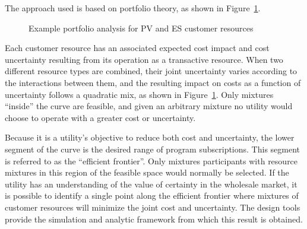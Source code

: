 The approach used is based on portfolio theory, as shown in Figure~\ref{fig:portfolio}. 
\begin{figure}[!t]
    \centering
    \caption{Example portfolio analysis for PV and ES customer resources}
    \label{fig:portfolio}
\end{figure}
Each customer resource has an associated expected cost impact and cost uncertainty resulting from its operation as a transactive resource.  When two different resource types are combined, their joint uncertainty varies according to the interactions between them, and the resulting impact on costs as a function of uncertainty follows a quadratic mix, as shown in Figure~\ref{fig:portfolio}. Only mixtures ``inside'' the curve are feasible, and given an arbitrary mixture no utility would choose to operate with a greater cost or uncertainty.  

Because it is a utility's objective to reduce both cost and uncertainty, the lower segment of the curve is the desired range of program subscriptions. This segment is referred to as the ``efficient frontier''.  Only mixtures participants with resource mixtures in this region of the feasible space would normally be selected. If the utility has an understanding of the value of certainty in the wholesale market, it is possible to identify a single point along the efficient frontier where mixtures of customer resources will minimize the joint cost and uncertainty. The design tools provide the simulation and analytic framework from which this result is obtained.

